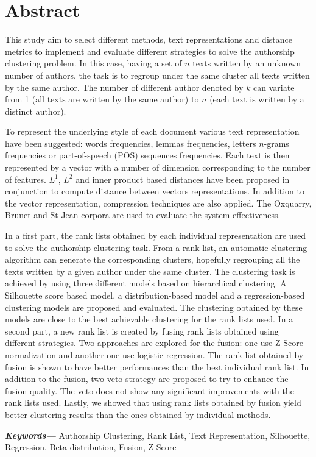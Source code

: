\chapter*{Abstract}
This study aim to select different methods, text representations and distance metrics to implement and evaluate different strategies to solve the authorship clustering problem.
In this case, having a set of $n$ texts written by an unknown number of authors, the task is to regroup under the same cluster all texts written by the same author.
The number of different author denoted by $k$ can variate from 1 (all texts are written by the same author) to $n$ (each text is written by a distinct author).

To represent the underlying style of each document various text representation have been suggested: words frequencies, lemmas frequencies, letters $n$-grams frequencies or part-of-speech (POS) sequences frequencies.
Each text is then represented by a vector with a number of dimension corresponding to the number of features.
$L^1$, $L^2$ and inner product based distances have been proposed in conjunction to compute distance between vectors representations.
In addition to the vector representation, compression techniques are also applied.
The Oxquarry, Brunet and St-Jean corpora are used to evaluate the system effectiveness.

In a first part, the rank lists obtained by each individual representation are used to solve the authorship clustering task.
From a rank list, an automatic clustering algorithm can generate the corresponding clusters, hopefully regrouping all the texts written by a given author under the same cluster.
The clustering task is achieved by using three different models based on hierarchical clustering.
A Silhouette score based model, a distribution-based model and a regression-based clustering models are proposed and evaluated.
The clustering obtained by these models are close to the best achievable clustering for the rank lists used.
In a second part, a new rank list is created by fusing rank lists obtained using different strategies.
Two approaches are explored for the fusion: one use Z-Score normalization and another one use logistic regression.
The rank list obtained by fusion is shown to have better performances than the best individual rank list.
In addition to the fusion, two veto strategy are proposed to try to enhance the fusion quality.
The veto does not show any significant improvements with the rank lists used.
Lastly, we showed that using rank lists obtained by fusion yield better clustering results than the ones obtained by individual methods.


{\small \textbf{\textit{Keywords---}} Authorship Clustering, Rank List, Text Representation, Silhouette, Regression, Beta distribution, Fusion, Z-Score}

